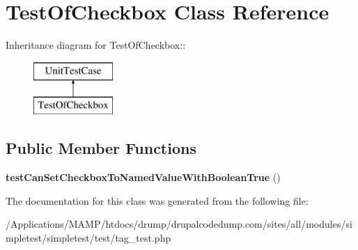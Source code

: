 \hypertarget{class_test_of_checkbox}{
\section{TestOfCheckbox Class Reference}
\label{class_test_of_checkbox}
}
Inheritance diagram for TestOfCheckbox::\begin{figure}[H]
\begin{center}
\leavevmode
\includegraphics[height=2cm]{class_test_of_checkbox}
\end{center}
\end{figure}
\subsection*{Public Member Functions}
\begin{DoxyCompactItemize}
\item 
\hypertarget{class_test_of_checkbox_a9801a7eb53f39613437e5320df2ae79e}{
{\bfseries testCanSetCheckboxToNamedValueWithBooleanTrue} ()}
\label{class_test_of_checkbox_a9801a7eb53f39613437e5320df2ae79e}

\end{DoxyCompactItemize}


The documentation for this class was generated from the following file:\begin{DoxyCompactItemize}
\item 
/Applications/MAMP/htdocs/drump/drupalcodedump.com/sites/all/modules/simpletest/simpletest/test/tag\_\-test.php\end{DoxyCompactItemize}
